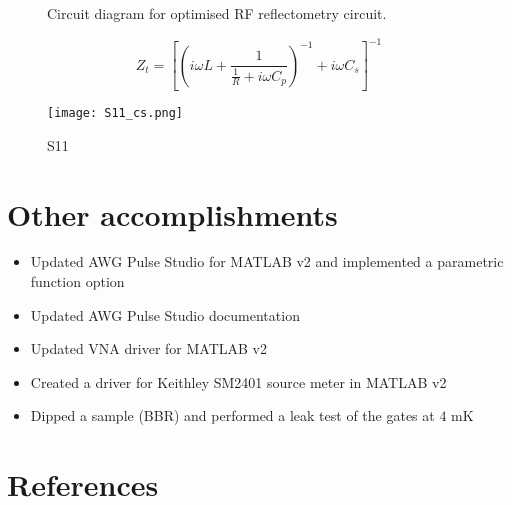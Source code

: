 \documentclass{article}
\begin{document}
\begin{figure}[tp]
    \caption{Circuit diagram for optimised RF reflectometry circuit.}
    \label{fig:opt_circuit}
\end{figure}

\begin{equation}
    Z_t = \left[ \left(i\omega L + \frac1{\frac1R + i\omega C_p}\right)^{-1} + i\omega C_s \right]^{-1}
    \label{eq:zt}
\end{equation}

\begin{figure}[tp]
    \centering
    \texttt{[image: S11\_cs.png]}
    \caption{S11}
    \label{fig:s11_cs}
\end{figure}

\section{Other accomplishments}

\begin{itemize}
    \item Updated AWG Pulse Studio for MATLAB v2 and implemented a parametric function option
    \item Updated AWG Pulse Studio documentation
    \item Updated VNA driver for MATLAB v2
    \item Created a driver for Keithley SM2401 source meter in MATLAB v2
    \item Dipped a sample (BBR) and performed a leak test of the gates at $4$ \si{\milli\kelvin}
\end{itemize}



\section{References}
\end{document}
